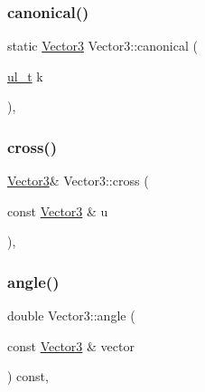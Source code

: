 \subsubsection{\texorpdfstring{canonical()}{canonical()}}
{\footnotesize\ttfamily static \mbox{\hyperlink{class_vector3}{Vector3}} Vector3\+::canonical (\begin{DoxyParamCaption}\item[{\mbox{\hyperlink{typedef_8h_a1b140a2034db3f5dfe18a987745df43a}{ul\+\_\+t}}}]{k }\end{DoxyParamCaption})\hspace{0.3cm}{\ttfamily [inline]}, {\ttfamily [static]}}

\mbox{\label{class_vector3_ab4221b101df67f562347dde6738c66fc}} 
\subsubsection{\texorpdfstring{cross()}{cross()}}
{\footnotesize\ttfamily \mbox{\hyperlink{class_vector3}{Vector3}}\& Vector3\+::cross (\begin{DoxyParamCaption}\item[{const \mbox{\hyperlink{class_vector3}{Vector3}} \&}]{u }\end{DoxyParamCaption})\hspace{0.3cm}{\ttfamily [inline]}, {\ttfamily [protected]}}

\mbox{\label{class_vector3_a4ec864436ebac499950f4c06091688db}} 
\subsubsection{\texorpdfstring{angle()}{angle()}}
{\footnotesize\ttfamily double Vector3\+::angle (\begin{DoxyParamCaption}\item[{const \mbox{\hyperlink{class_vector3}{Vector3}} \&}]{vector }\end{DoxyParamCaption}) const\hspace{0.3cm}{\ttfamily [inline]}, {\ttfamily [protected]}}

\mbox{\label{class_vector3_a98422ceb8200829cea11bdeb6417daba}} 
